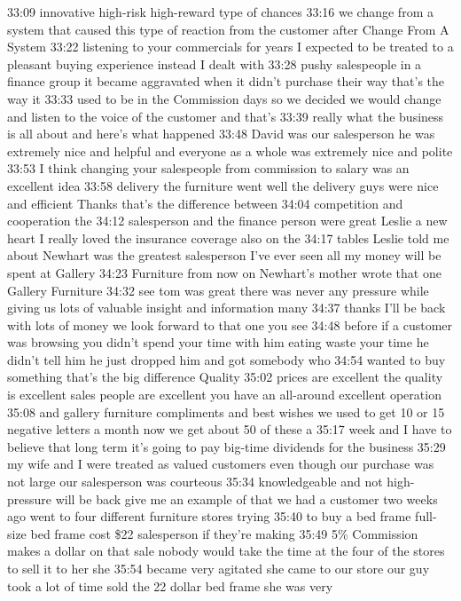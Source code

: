 \documentclass[
]{book}
\begin{document}
33:09
innovative high-risk high-reward type of chances
33:16
we change from a system that caused this type of reaction from the customer after
Change From A System
33:22
listening to your commercials for years I expected to be treated to a pleasant buying experience instead I dealt with
33:28
pushy salespeople in a finance group it became aggravated when it didn't purchase their way that's the way it
33:33
used to be in the Commission days so we decided we would change and listen to the voice of the customer and that's
33:39
really what the business is all about and here's what happened
33:48
David was our salesperson he was extremely nice and helpful and everyone as a whole was extremely nice and polite
33:53
I think changing your salespeople from commission to salary was an excellent idea
33:58
delivery the furniture went well the delivery guys were nice and efficient Thanks that's the difference between
34:04
competition and cooperation the
34:12
salesperson and the finance person were great Leslie a new heart I really loved the insurance coverage also on the
34:17
tables Leslie told me about Newhart was the greatest salesperson I've ever seen all my money will be spent at Gallery
34:23
Furniture from now on Newhart's mother wrote that one
Gallery Furniture
34:32
see tom was great there was never any pressure while giving us lots of valuable insight and information many
34:37
thanks I'll be back with lots of money we look forward to that one you see
34:48
before if a customer was browsing you didn't spend your time with him eating waste your time he didn't tell him he just dropped him and got somebody who
34:54
wanted to buy something that's the big difference
Quality
35:02
prices are excellent the quality is excellent sales people are excellent you have an all-around excellent operation
35:08
and gallery furniture compliments and best wishes we used to get 10 or 15 negative letters a month now we get about 50 of these a
35:17
week and I have to believe that long term it's going to pay big-time dividends for the business
35:29
my wife and I were treated as valued customers even though our purchase was not large our salesperson was courteous
35:34
knowledgeable and not high-pressure will be back give me an example of that we had a customer two weeks ago went to four different furniture stores trying
35:40
to buy a bed frame full-size bed frame cost \$22 salesperson if they're making
35:49
5\% Commission makes a dollar on that sale nobody would take the time at the four of the stores to sell it to her she
35:54
became very agitated she came to our store our guy took a lot of time sold the 22 dollar bed frame she was very
\end{document}
